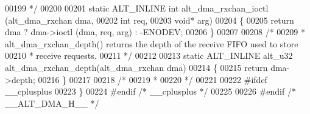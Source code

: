 \begin{DoxyCode}
00199 \textcolor{comment}{ */}
00200 
00201 \textcolor{keyword}{static} ALT_INLINE \textcolor{keywordtype}{int} alt_dma_rxchan_ioctl (alt_dma_rxchan dma, 
00202               \textcolor{keywordtype}{int}            req, 
00203               \textcolor{keywordtype}{void}*          arg)
00204 \{
00205   \textcolor{keywordflow}{return} dma ? dma->ioctl (dma, req, arg) : -ENODEV;
00206 \}
00207 
00208 \textcolor{comment}{/*}
00209 \textcolor{comment}{ * alt\_dma\_rxchan\_depth() returns the depth of the receive FIFO used to store}
00210 \textcolor{comment}{ * receive requests.}
00211 \textcolor{comment}{ */}
00212 
00213 \textcolor{keyword}{static} ALT_INLINE alt_u32 alt_dma_rxchan_depth(alt_dma_rxchan dma)
00214 \{
00215   \textcolor{keywordflow}{return} dma->depth;
00216 \}
00217 
00218 \textcolor{comment}{/*}
00219 \textcolor{comment}{ *}
00220 \textcolor{comment}{ */}
00221 
00222 \textcolor{preprocessor}{#ifdef \_\_cplusplus}
00223 \}
00224 \textcolor{preprocessor}{#endif }\textcolor{comment}{/* \_\_cplusplus */}\textcolor{preprocessor}{}
00225 
00226 \textcolor{preprocessor}{#endif }\textcolor{comment}{/* \_\_ALT\_DMA\_H\_\_ */}\textcolor{preprocessor}{}
\end{DoxyCode}

